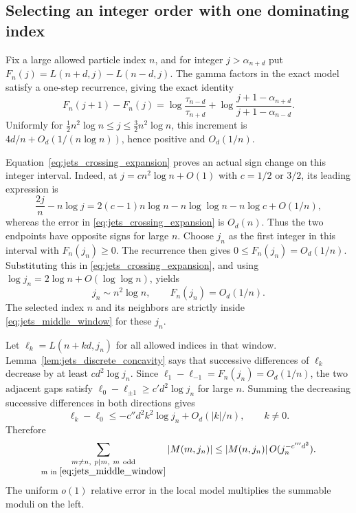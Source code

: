 \documentclass[11pt]{article}
\numberwithin{equation}{section}
\theoremstyle{definition}
\begin{document}
\subsection{Selecting an integer order with one dominating index}

Fix a large allowed particle index $n$, and for integer
$j>\alpha_{n+d}$ put
$F_n(j)=L(n+d,j)-L(n-d,j)$.  The gamma factors in the exact model
satisfy a one-step recurrence, giving the exact identity
\begin{equation}\label{eq:jets_crossing_derivative}
 F_n(j+1)-F_n(j)
 =\log\frac{\tau_{n-d}}{\tau_{n+d}}
   +\log\frac{j+1-\alpha_{n+d}}{j+1-\alpha_{n-d}}.
\end{equation}
Uniformly for $\tfrac12n^2\log n\le j\le\tfrac32n^2\log n$,
this increment is $4d/n+O_d(1/(n\log n))$, hence positive and
$O_d(1/n)$.

Equation~\eqref{eq:jets_crossing_expansion} proves an actual sign
change on this integer interval.  Indeed, at
$j=c n^2\log n+O(1)$ with $c=1/2$ or $3/2$, its leading expression is
\[
 \frac{2j}{n}-n\log j
   =2(c-1)n\log n-n\log\log n-n\log c+O(1/n),
\]
whereas the error in \eqref{eq:jets_crossing_expansion} is $O_d(n)$.
Thus the two endpoints have opposite signs for large $n$.
Choose $j_n$ as the first integer in this interval with $F_n(j_n)\ge0$.
The recurrence then gives $0\le F_n(j_n)=O_d(1/n)$.  Substituting
this in \eqref{eq:jets_crossing_expansion}, and using
$\log j_n=2\log n+O(\log\log n)$, yields
\begin{equation}\label{eq:jets_selected_j}
 j_n\sim n^2\log n,\qquad F_n(j_n)=O_d(1/n).
\end{equation}
The selected index $n$ and its neighbors are strictly inside
\eqref{eq:jets_middle_window} for these $j_n$.

Let $\ell_k=L(n+kd,j_n)$ for all allowed indices in that window.
Lemma~\ref{lem:jets_discrete_concavity} says that successive differences
of $\ell_k$ decrease by at least $cd^2\log j_n$.
Since $\ell_1-\ell_{-1}=F_n(j_n)=O_d(1/n)$, the two adjacent gaps
satisfy $\ell_0-\ell_{\pm1}\ge c'd^2\log j_n$ for large $n$.
Summing the decreasing successive differences in both directions gives
\[
 \ell_k-\ell_0\le-c''d^2 k^2\log j_n+O_d(|k|/n),\qquad k\ne0.
\]
Therefore
\begin{equation}\label{eq:jets_single_index}
 \sum_{\substack{m\ne n,\ p\mid m,\ m\ \mathrm{odd}\\
                  m\text{ in }\eqref{eq:jets_middle_window}}}
 |M(m,j_n)|
 \le |M(n,j_n)|\,O(j_n^{-c'''d^2}).
\end{equation}
The uniform $o(1)$ relative error in the local model multiplies
the summable moduli on the left.
\end{document}
